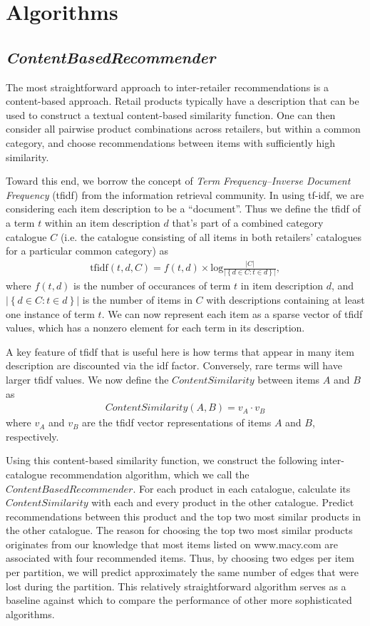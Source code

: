 \documentclass[11pt]{article}
\begin{document}
\section*{Algorithms}

\subsection*{\em ContentBasedRecommender}
The most straightforward approach to inter-retailer recommendations is a
content-based approach. Retail products typically have a description that can be
used to construct a textual content-based similarity function. One can then
consider all pairwise product combinations across retailers, but within a common
category, and choose recommendations between items with sufficiently high
similarity.

Toward this end, we borrow the concept of {\em Term Frequency--Inverse Document
Frequency} (tfidf) from the information retrieval community. In using tf-idf, we
are considering each item description to be a ``document''.  Thus we define the
tfidf of a term $t$ within an item description $d$ that's part of a combined
category catalogue $C$ (i.e. the catalogue consisting of all items in both
retailers' catalogues for a particular common category) as
\begin{align}
\mathrm{tfidf}(t,d,C) = f(t,d) \times
\mathrm{log}\frac{\left|C\right|}{\left|\left\{d \in C : t \in
d\right\}\right|},
\end{align}
where $f(t,d)$ is the number of occurances of term $t$ in item description $d$,
and $\left|\left\{d \in C : t \in d\right\}\right|$ is the number of items in
$C$ with descriptions containing at least one instance of term $t$.  We can now
represent each item as a sparse vector of tfidf values, which has a nonzero
element for each term in its description.

A key feature of tfidf that is useful here is how terms that appear in many item
description are discounted via the idf factor. Conversely, rare terms will have
larger tfidf values. We now define the $ContentSimilarity$ between items $A$ and
$B$ as
\begin{align}
ContentSimilarity(A,B) = v_A \cdot v_B
\end{align}
where $v_A$ and $v_B$ are the tfidf vector representations of items $A$ and $B$,
respectively.

Using this content-based similarity function, we construct the following
inter-catalogue recommendation algorithm, which we call the $ContentBased
Recommender$. For each product in each catalogue, calculate its
$ContentSimilarity$ with each and every product in the other catalogue. Predict
recommendations between this product and the top two most similar products in
the other catalogue. The reason for choosing the top two most similar products
originates from our knowledge that most items listed on www.macy.com are
associated with four recommended items. Thus, by choosing two edges per item per
partition, we will predict approximately the same number of edges that were lost
during the partition. This relatively straightforward algorithm serves as a
baseline against which to compare the performance of other more sophisticated
algorithms.
\end{document}

